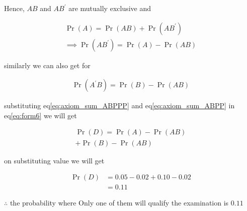\documentclass[journal,12pt,twocolumn]{IEEEtran}
\providecommand{\pr}[1]{\ensuremath{\Pr\left(#1\right)}}
\begin{document}
\begin{enumerate}
    Hence, $AB$ and $AB^{\prime}$ are mutually exclusive and 
    
            \begin{align}
                     \pr{A} = \pr{AB} + \pr{AB^{\prime}} \\
                  \implies 
                     \pr{A B^{\prime}} =  \pr{A} - \pr{AB}
                     \label{eq:axiom_sum_ABPP}
            \end{align}
    
    similarly we can also get for 
    
            \begin{align}
                   \pr{A^{\prime} B} =  \pr{B} - \pr{AB}
                   \label{eq:axiom_sum_ABPPP}
            \end{align}
    
    substituting eq\eqref{eq:axiom_sum_ABPPP} and eq\eqref{eq:axiom_sum_ABPP} in eq\eqref{eq:form6} we will get
    
            \begin{multline}
                  \label{eq:sum2}
                   \pr{D} = \pr{A} - \pr{AB} 
                 \\
                   +\pr{B} - \pr{AB}
            \end{multline}
    
    on substituting value we will get 
    
            \begin{align}
                 \pr{D} &=  0.05 - 0.02 + 0.10 - 0.02 \\
                        &= 0.11
            \end{align}    
    
    $\therefore$ the probability where Only one of them will qualify the examination is $0.11$
    


\end{enumerate}
\end{document}
